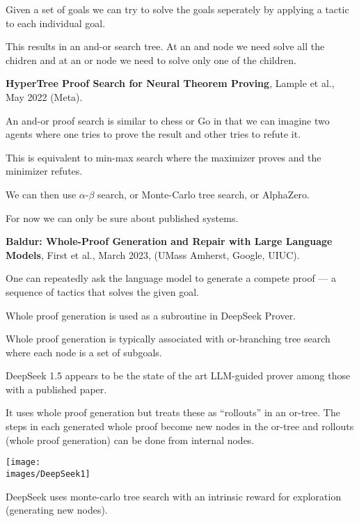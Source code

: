 {Given a set of goals we can try to solve the goals seperately by applying a tactic to each individual goal.

\vfill
This results in an and-or search tree.  At an and node we need solve all the chidren and at an or node we need to
solve only one of the children.

\vfill
{\bf HyperTree Proof Search for Neural Theorem Proving}, Lample et al., May 2022 (Meta).



An and-or proof search is similar to chess or Go in that we can imagine two agents where one tries to prove the result and other tries to refute it.

\vfill
This is equivalent to min-max search where the maximizer proves and the minimizer refutes.

\vfill
We can then use $\alpha$-$\beta$ search, or Monte-Carlo tree search, or AlphaZero.

\vfill
For now we can only be sure about published systems.



{\bf Baldur: Whole-Proof Generation and Repair with Large Language Models}, First et al., March 2023, (UMass Amherst, Google, UIUC).

\vfill
One can repeatedly ask the language model to generate
a compete proof --- a sequence of tactics that solves the given goal.

\vfill
Whole proof generation is used as a subroutine in DeepSeek Prover.

\vfill
Whole proof generation is typically associated with or-branching tree search where each node is a set of subgoals.


DeepSeek 1.5 appears to be the state of the art LLM-guided prover among those with a published paper.

\vfill
It uses whole proof generation but treats these as ``rollouts'' in an or-tree.  The steps in each generated whole proof
become new nodes in the or-tree and rollouts (whole proof generation) can be done from internal nodes.


\centerline{\texttt{[image: \\images/DeepSeek1]}}


DeepSeek uses monte-carlo tree search with an intrinsic reward for exploration (generating new nodes).


}
